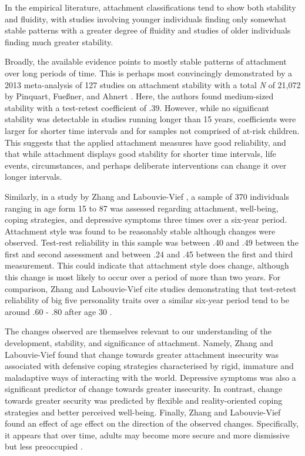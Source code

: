 \documentclass[12pt]{report}
\begin{document}
In the empirical literature, attachment classifications tend to show both stability and fluidity, with studies involving younger individuals finding only somewhat stable patterns with a greater degree of fluidity and studies of older individuals finding much greater stability.

Broadly, the available evidence points to mostly stable patterns of attachment over long periods of time. This is perhaps most convincingly demonstrated by a 2013 meta-analysis of 127 studies on attachment stability with a total \textit{N} of 21,072 by Pinquart, Fueßner, and Ahnert \cite{Pinquart2013}. Here, the authors found medium-sized stability with a test-retest coefficient of .39. However, while no significant stability was detectable in studies running longer than 15 years, coefficients were larger for shorter time intervals and for samples not comprised of at-risk children.
This suggests that the applied attachment measures have good reliability, and that while attachment displays good stability for shorter time intervals, life events, circumstances, and perhaps deliberate interventions can change it over longer intervals.

Similarly, in a study by Zhang and Labouvie-Vief \cite{Zhang2004}, a sample of 370 individuals ranging in age form 15 to 87 was assessed regarding attachment, well-being, coping strategies, and depressive symptoms three times over a six-year period. Attachment style was found to be reasonably stable although changes were observed. Test-rest reliability in this sample was between .40 and .49 between the first and second assessment and between .24 and .45 between the first and third measurement. This could indicate that attachment style does change, although this change is most likely to occur over a period of more than two years. For comparison, Zhang and Labouvie-Vief cite studies demonstrating that test-retest reliability of big five personality traits over a similar six-year period tend to be around .60 - .80 after age 30 \cite{Costa1988,Roberts2000}.

The changes observed are themselves relevant to our understanding of the development, stability, and significance of attachment. Namely, Zhang and Labouvie-Vief found that change towards greater attachment insecurity was associated with defensive coping strategies characterised by rigid, immature and maladaptive ways of interacting with the world. Depressive symptoms was also a significant predictor of change towards greater insecurity. In contrast, change towards greater security was predicted by flexible and reality-oriented coping strategies and better perceived well-being.
Finally, Zhang and Labouvie-Vief found an effect of age effect on the direction of the observed changes. Specifically, it appears that over time, adults may become more secure and more dismissive but less preoccupied  \cite{Zhang2004}.
\end{document}
